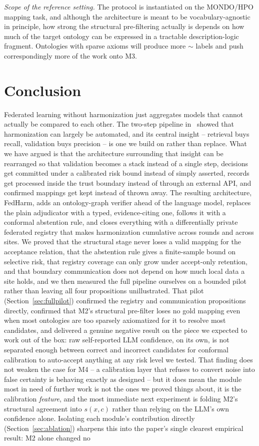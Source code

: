 \documentclass[conference]{IEEEtran}
\begin{document}
\textit{Scope of the reference setting.} The protocol is instantiated on the MONDO/HPO mapping task, and although the architecture is meant to be vocabulary-agnostic in principle, how strong the structural pre-filtering actually is depends on how much of the target ontology can be expressed in a tractable description-logic fragment. Ontologies with sparse axioms will produce more $\sim$ labels and push correspondingly more of the work onto M3.

\section{Conclusion}

Federated learning without harmonization just aggregates models that cannot actually be compared to each other. The two-step pipeline in~\cite{b1} showed that harmonization can largely be automated, and its central insight -- retrieval buys recall, validation buys precision -- is one we build on rather than replace. What we have argued is that the architecture surrounding that insight can be rearranged so that validation becomes a stack instead of a single step, decisions get committed under a calibrated risk bound instead of simply asserted, records get processed inside the trust boundary instead of through an external API, and confirmed mappings get kept instead of thrown away. The resulting architecture, FedHarm, adds an ontology-graph verifier ahead of the language model, replaces the plain adjudicator with a typed, evidence-citing one, follows it with a conformal abstention rule, and closes everything with a differentially private federated registry that makes harmonization cumulative across rounds and across sites. We proved that the structural stage never loses a valid mapping for the acceptance relation, that the abstention rule gives a finite-sample bound on selective risk, that registry coverage can only grow under accept-only retention, and that boundary communication does not depend on how much local data a site holds, and we then measured the full pipeline ourselves on a bounded pilot rather than leaving all four propositions unillustrated. That pilot (Section~\ref{sec:fullpilot}) confirmed the registry and communication propositions directly, confirmed that M2's structural pre-filter loses no gold mapping even when most ontologies are too sparsely axiomatized for it to resolve most candidates, and delivered a genuine negative result on the piece we expected to work out of the box: raw self-reported LLM confidence, on its own, is not separated enough between correct and incorrect candidates for conformal calibration to auto-accept anything at any risk level we tested. That finding does not weaken the case for M4 -- a calibration layer that refuses to convert noise into false certainty is behaving exactly as designed -- but it does mean the module most in need of further work is not the ones we proved things about, it is the calibration \emph{feature}, and the most immediate next experiment is folding M2's structural agreement into $s(x,c)$ rather than relying on the LLM's own confidence alone. Isolating each module's contribution directly (Section~\ref{sec:ablation}) sharpens this into the paper's single clearest empirical result: M2 alone changed no 
\end{document}
